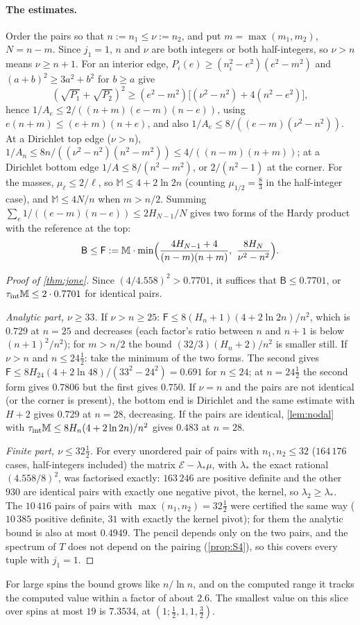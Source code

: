\paragraph{The estimates.}
Order the pairs so that $n:=n_1\le\nu:=n_2$, and put $m=\max(m_1,m_2)$, $N=n-m$. Since
$j_1=1$, $n$ and $\nu$ are both integers or both half-integers, so $\nu>n$ means $\nu\ge n+1$.
For an interior edge, $P_i(e)\ge(n_i^2-e^2)(e^2-m^2)$ and $(a+b)^2\ge3a^2+b^2$ for $b\ge a$
give
\[
  (\sqrt{P_1}+\sqrt{P_2})^2\ge(e^2-m^2)\bigl[(\nu^2-n^2)+4(n^2-e^2)\bigr],
\]
hence $1/A_e\le2/((n+m)(e-m)(n-e))$, using $e(n+m)\le(e+m)(n+e)$, and also
$1/A_e\le8/((e-m)(\nu^2-n^2))$. At a Dirichlet top edge ($\nu>n$),
$1/A_n\le8n/((\nu^2-n^2)(n^2-m^2))\le4/((n-m)(n+m))$; at a Dirichlet bottom edge
$1/A\le8/(n^2-m^2)$, or $2/(n^2-1)$ at the corner. For the masses, $\mu_\ell\le2/\ell$, so
$\mathbb M\le4+2\ln2n$ (counting $\mu_{1/2}=\frac83$ in the half-integer case), and
$\mathbb M\le4N/n$ when $m>n/2$. Summing $\sum_e1/((e-m)(n-e))\le2H_{N-1}/N$ gives two
forms of the Hardy product with the reference at the top:
\[
  \mathsf B\le\mathsf F:=\mathbb M\cdot\min\Bigl(\frac{4H_{N-1}+4}{(n-m)(n+m)},\ \frac{8H_N}{\nu^2-n^2}\Bigr).
\]

\begin{proof}[Proof of \cref{thm:jone}]
Since $(4/4.558)^2>0.7701$, it suffices that $\mathsf B\le0.7701$, or $\tau_{\rm int}\mathbb M\le2\cdot0.7701$ for
identical pairs.

\emph{Analytic part, $\nu\ge33$.}
If $\nu>n\ge25$: $\mathsf F\le8(H_n+1)(4+2\ln2n)/n^2$, which is $0.729$ at $n=25$ and decreases
(each factor's ratio between $n$ and $n+1$ is below $(n+1)^2/n^2$); for $m>n/2$ the bound
$(32/3)(H_n+2)/n^2$ is smaller still.
If $\nu>n$ and $n\le24\frac12$: take the minimum of the two forms. The second gives
$\mathsf F\le8H_{24}(4+2\ln48)/(33^2-24^2)=0.691$ for $n\le24$; at $n=24\frac12$ the second form
gives $0.7806$ but the first gives $0.750$.
If $\nu=n$ and the pairs are not identical (or the corner is present), the bottom end is
Dirichlet and the same estimate with $H+2$ gives $0.729$ at $n=28$, decreasing.
If the pairs are identical, \cref{lem:nodal} with $\tau_{\rm int}\mathbb M\le8H_n(4+2\ln2n)/n^2$
gives $0.483$ at $n=28$.

\emph{Finite part, $\nu\le32\frac12$.}
For every unordered pair of pairs with $n_1,n_2\le32$ ($164\,176$ cases, half-integers
included) the matrix $\mathcal E-\lambda_*\mu$, with $\lambda_*$ the exact rational $(4.558/8)^2$, was factorised exactly: $163\,246$ are positive
definite and the other $930$ are identical pairs with exactly one negative pivot, the
kernel, so $\lambda_2\ge\lambda_*$. The $10\,416$ pairs of pairs with $\max(n_1,n_2)=32\frac12$
were certified the same way ($10\,385$ positive definite, $31$ with exactly the kernel
pivot); for them the analytic bound is also at most $0.4949$. The pencil depends only on
the two pairs, and the spectrum of $T$ does not depend on the pairing (\cref{prop:S4}), so
this covers every tuple with $j_1=1$.
\end{proof}

For large spins the bound grows like $n/\ln n$, and on the computed range it tracks the
computed value within a factor of about $2.6$. The smallest value on this slice over
spins at most $19$ is $7.3534$, at $(1;\frac12,1,1,\frac32)$.

